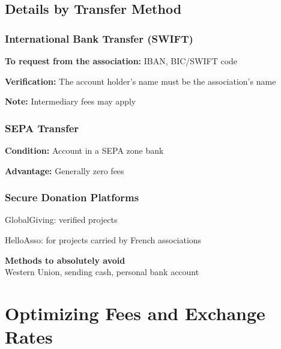 \documentclass[12pt, a4paper]{article}
\begin{document}
\subsection{Details by Transfer Method}

\subsubsection{International Bank Transfer (SWIFT)}
\begin{arrowlist}
    \item \textbf{To request from the association:} IBAN, BIC/SWIFT code
    \item \textbf{Verification:} The account holder's name must be the association's name
    \item \textbf{Note:} Intermediary fees may apply
\end{arrowlist}

\subsubsection{SEPA Transfer}
\begin{arrowlist}
    \item \textbf{Condition:} Account in a SEPA zone bank
    \item \textbf{Advantage:} Generally zero fees
\end{arrowlist}

\subsubsection{Secure Donation Platforms}
\begin{arrowlist}
    \item GlobalGiving: verified projects
    \item HelloAsso: for projects carried by French associations
\end{arrowlist}

\begin{alertbox}
    \centering
    \textbf{Methods to absolutely avoid} \\
    \vspace{0.2cm}
    Western Union, sending cash, personal bank account
\end{alertbox}

\newpage

\section{Optimizing Fees and Exchange Rates}
\end{document}
